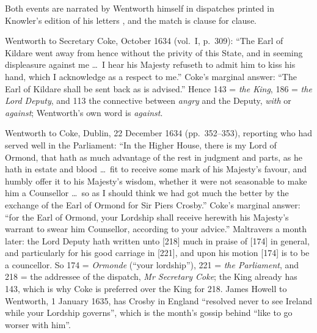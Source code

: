 \documentclass[11pt]{article}
\begin{document}
Both events are narrated by Wentworth himself in dispatches printed in Knowler's edition of his letters \cite{Knowler:1739}, and the match is clause for clause.

Wentworth to Secretary Coke, October 1634 (vol.~I, p.~309): ``The Earl of Kildare went away from hence without the privity of this State, and in seeming displeasure against me \ldots\ I hear his Majesty refuseth to admit him to kiss his hand, which I acknowledge as a respect to me.'' Coke's marginal answer: ``The Earl of Kildare shall be sent back as is advised.'' Hence 143 = \emph{the King}, 186 = \emph{the Lord Deputy}, and 113 the connective between \emph{angry} and the Deputy, \emph{with} or \emph{against}; Wentworth's own word is \emph{against}.

Wentworth to Coke, Dublin, 22 December 1634 (pp.~352--353), reporting who had served well in the Parliament: ``In the Higher House, there is my Lord of Ormond, that hath as much advantage of the rest in judgment and parts, as he hath in estate and blood \ldots\ fit to receive some mark of his Majesty's favour, and humbly offer it to his Majesty's wisdom, whether it were not seasonable to make him a Counsellor \ldots\ so as I should think we had got much the better by the exchange of the Earl of Ormond for Sir Piers Crosby.'' Coke's marginal answer: ``for the Earl of Ormond, your Lordship shall receive herewith his Majesty's warrant to swear him Counsellor, according to your advice.'' Maltravers a month later: the Lord Deputy hath written unto [218] much in praise of [174] in general, and particularly for his good carriage in [221], and upon his motion [174] is to be a councellor. So 174 = \emph{Ormonde} (``your lordship''), 221 = \emph{the Parliament}, and 218 = the addressee of the dispatch, \emph{Mr Secretary Coke}; the King already has 143, which is why Coke is preferred over the King for 218. James Howell to Wentworth, 1 January 1635, has Crosby in England ``resolved never to see Ireland while your Lordship governs'', which is the month's gossip behind ``like to go worser with him''.
\end{document}
